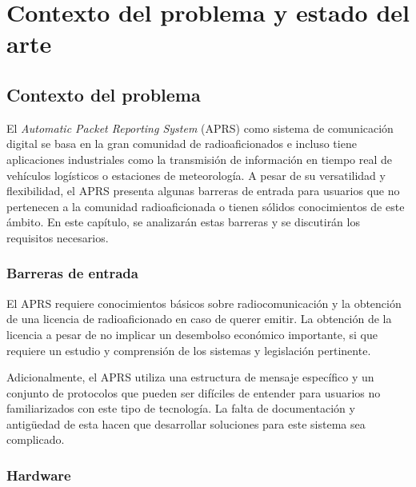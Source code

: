 \titlespacing*{\chapter}{0pt}{-1.25cm}{25pt}
\chapter{Contexto del problema y estado del arte}

\section{Contexto del problema}

El \textit{Automatic Packet Reporting System} (APRS) como sistema de comunicación digital se basa en la gran comunidad de radioaficionados e incluso tiene aplicaciones industriales como la transmisión de información en tiempo real de vehículos logísticos o estaciones de meteorología. A pesar de su versatilidad y flexibilidad, el APRS presenta algunas barreras de entrada para usuarios que no pertenecen a la comunidad radioaficionada o tienen sólidos conocimientos de este ámbito. En este capítulo, se analizarán estas barreras y se discutirán los requisitos necesarios.

\subsection{Barreras de entrada}

El APRS requiere conocimientos básicos sobre radiocomunicación y la obtención de una licencia de radioaficionado en caso de querer emitir. La obtención de la licencia a pesar de no implicar un desembolso económico importante, si que requiere un estudio y comprensión de los sistemas y legislación pertinente.

Adicionalmente, el APRS utiliza una estructura de mensaje específico y un conjunto de protocolos que pueden ser difíciles de entender para usuarios no familiarizados con este tipo de tecnología. La falta de documentación y antigüedad de esta hacen que desarrollar soluciones para este sistema sea complicado.

\subsection{Hardware}

